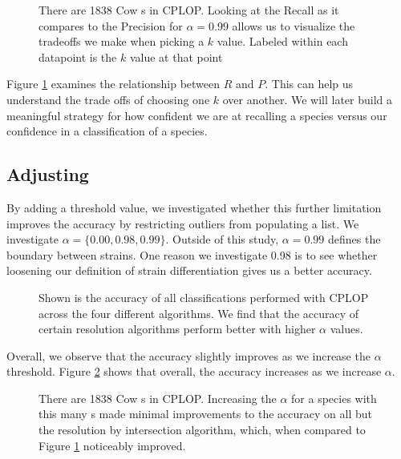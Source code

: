 \begin{figure}[t]
\centering
{}
\caption{There are 1838 Cow \isol{}s in CPLOP. Looking at the Recall as it compares to the Precision for $\alpha=0.99$ allows us to visualize the tradeoffs we make when picking a $k$ value. Labeled within each datapoint is the $k$ value at that point}
\label{fig:k_cow_pvr}
\end{figure}
Figure \ref{fig:k_cow_pvr} examines the relationship between $R$ and $P$. This can help us understand the trade offs of choosing one $k$ over another. We will later build a meaningful strategy for how confident we are at recalling a species versus our confidence in a classification of a species.


\subsection{Adjusting \a{}}
By adding a threshold value, we investigated whether this further limitation improves the accuracy by restricting outliers from populating a \knn{} list. We investigate $\alpha = \{0.00,0.98,0.99\}$. Outside of this study, $\alpha = 0.99$ defines the boundary between strains. One reason we investigate 0.98 is to see whether loosening our definition of strain differentiation gives us a better accuracy.

\begin{figure}[t]
\centering
{}
\caption{Shown is the accuracy of all classifications performed with CPLOP across the four different algorithms. We find that the accuracy of certain resolution algorithms perform better with higher $\alpha$ values.}
\label{fig:alpha_overall}
\end{figure}

Overall, we observe that the accuracy slightly improves as we increase the $\alpha$ threshold. Figure \ref{fig:alpha_overall} shows that overall, the accuracy increases as we increase $\alpha$. 


\begin{figure}[t]
\centering
{}
\caption{There are 1838 Cow \isol{}s in CPLOP. Increasing the $\alpha$ for a species with this many \isol{}s made minimal improvements to the accuracy on all but the resolution by intersection algorithm, which, when compared to Figure \ref{fig:k_cow_pvr} noticeably improved.}
\label{fig:alpha_cow_pvr}
\end{figure}

